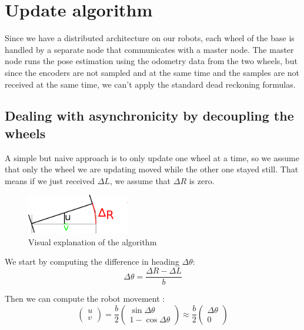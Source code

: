 \documentclass[a4paper, 10pt]{article}
\begin{document}
\section{Update algorithm}
Since we have a distributed architecture on our robots, each wheel of the base is handled by a separate node that communicates with a master node.
The master node runs the pose estimation using the odometry data from the two wheels, but since the encoders are not sampled and at the same time and the samples are not received at the same time, we can't apply the standard dead reckoning formulas.

\subsection{Dealing with asynchronicity by decoupling the wheels}
A simple but naive approach is to only update one wheel at a time, so we assume that only the wheel we are updating moved while the other one stayed still.
That means if we just received $\Delta L$, we assume that $\Delta R$ is zero.

\begin{figure}[h]
    \begin{center}
        \includegraphics[width=0.4\textwidth]{algorithm.png}
        \caption{Visual explanation of the algorithm}
    \end{center}
\end{figure}

We start by computing the difference in heading $\Delta \theta$:
\begin{equation}
    \Delta \theta = \frac{\Delta R - \Delta L}{b}
\end{equation}

Then we can compute the robot movement :
\begin{equation}
    \begin{pmatrix}
        u\\v
    \end{pmatrix}
    =
    \frac{b}{2}
    \begin{pmatrix}
        \sin \Delta \theta\\1 - \cos \Delta \theta
    \end{pmatrix}
    \approx
    \frac{b}{2}
    \begin{pmatrix}
        \Delta \theta\\ 0
    \end{pmatrix}
\end{equation}
\end{document}

